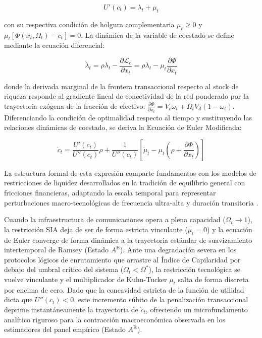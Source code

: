 \begin{equation}
U'(c_t)=\lambda_t+\mu_t
\end{equation}

con su respectiva condici\'on de holgura complementaria $\mu_t \geq 0$ y $\mu_t[\Phi(x_t,\Omega_t)-c_t]=0$. La din\'amica de la variable de coestado se define mediante la ecuaci\'on diferencial:

\begin{equation}
\dot{\lambda}_t = \rho\lambda_t - \frac{\partial \mathcal{L}_c}{\partial x_t} = \rho\lambda_t - \mu_t\frac{\partial \Phi}{\partial x_t}
\end{equation}

donde la derivada marginal de la frontera transaccional respecto al stock de riqueza responde al gradiente lineal de conectividad de la red ponderado por la trayectoria ex\'ogena de la fracci\'on de efectivo: $\frac{\partial \Phi}{\partial x_t} = V_c \omega_t + \Omega_t V_d (1 - \omega_t)$. Diferenciando la condici\'on de optimalidad respecto al tiempo y sustituyendo las relaciones din\'amicas de coestado, se deriva la Ecuaci\'on de Euler Modificada:

\begin{equation}
\dot{c}_t = \frac{U'(c_t)}{U''(c_t)}\rho + \frac{1}{U''(c_t)} \left[ \dot{\mu}_t - \mu_t \left( \rho + \frac{\partial \Phi}{\partial x_t} \right) \right]
\end{equation}

La estructura formal de esta expresi\'on comparte fundamentos con los modelos de restricciones de liquidez desarrollados en la tradici\'on de equilibrio general con fricciones financieras, adaptando la escala temporal para representar perturbaciones macro-tecnol\'ogicas de frecuencia ultra-alta y duraci\'on transitoria \citep{alvarez2009financial}.

Cuando la infraestructura de comunicaciones opera a plena capacidad ($\Omega_t \to 1$), la restricci\'on SIA deja de ser de forma estricta vinculante ($\mu_t=0$) y la ecuaci\'on de Euler converge de forma din\'amica a la trayectoria est\'andar de suavizamiento intertemporal de Ramsey (Estado $A^{\text{E}}$). Ante una degradaci\'on severa en los protocolos l\'ogicos de enrutamiento que arrastre al \'Indice de Capilaridad por debajo del umbral cr\'itico del sistema ($\Omega_t < \Omega^*$), la restricci\'on tecnol\'ogica se vuelve vinculante y el multiplicador de Kuhn-Tucker $\mu_t$ salta de forma discreta por encima de cero. Dado que la concavidad estricta de la funci\'on de utilidad dicta que $U''(c_t)<0$, este incremento s\'ubito de la penalizaci\'on transaccional deprime instant\'aneamente la trayectoria de $\dot{c}_t$, ofreciendo un microfundamento anal\'itico riguroso para la contracci\'on macroecon\'omica observada en los estimadores del panel emp\'irico (Estado $A^{\text{R}}$).

